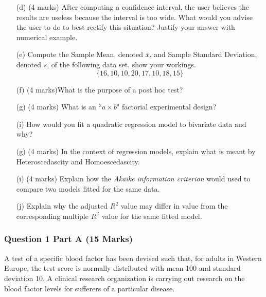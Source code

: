 \documentclass[a4paper,12pt]{article}
\begin{document}
\begin{itemize}
	
	
	\item[(d)] (4 marks) After computing a confidence interval, the user believes the results are useless
	because the interval is too wide. What would you advise the user to do to best
	rectify this situation? Justify your answer with numerical example.
	\item[(e)]  Compute the Sample Mean, denoted $\bar{x}$, and Sample Standard Deviation, denoted $s$, of the following data set. show your workings. 
	\[\{16, 10, 10, 20, 17, 10, 18, 15\}\]
	
	
	\item[(f)] (4 marks)What is the purpose of a post hoc test? 	
	
	\item[(g)] (4 marks) What is an ``$a \times b$" factorial experimental design?
	
	
	\item[(i)] How would you fit a quadratic regression model to bivariate data and why?
	
	
	\item[(g)] (4 marks) In the context of regression models, explain what is meant by Heteroscedascity and Homoescedascity.
	
	
	\item[(i)] (4 marks)  Explain how the \emph{Akaike information criterion} would used to compare two models fitted for the same data.
	\item[(j)] Explain why the adjusted $R^2$ value may differ in value from the corresponding multiple $R^2$ value for the same fitted model.
	
\end{itemize}

\subsubsection*{Question 1 Part A (15 Marks)}

A test of a specific blood factor has been devised such that, for adults in Western Europe, the test score is normally distributed with mean 100 and standard deviation 10. A clinical research organization is carrying out research on the blood factor levels for sufferers of a particular disease.  
\end{document}

